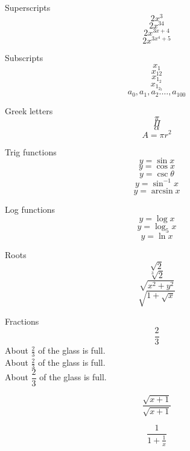 \documentclass[11pt]{article}
\begin{document}
Superscripts $$2x^3$$
$$2x^{34}$$
$$2x^{3x+4}$$
$$2x^{3x^4+5}$$

Subscripts
$$x_1$$
$$x_{12}$$
$$x_{1_2}$$
$$x_{1_{2_3}}$$
$$a_0, a_1, a_2. \ldots, a_{100}$$

Greek letters
$$\pi$$
$$\Pi$$
$$\alpha$$
$$A=\pi r^2$$

Trig functions
$$y=\sin x$$
$$y=\cos x$$
$$y=\csc \theta$$
$$y=\sin^{-1} x$$
$$y=\arcsin x$$

Log functions
$$y=\log x$$
$$y=\log_5 x$$
$$y=\ln x$$

Roots
$$\sqrt{2}$$
$$\sqrt[3]{2}$$
$$\sqrt{x^2+y^2}$$
$$\sqrt{1+\sqrt{x}}$$

Fractions
$$\frac{2}{3}$$
About $\frac{2}{3}$ of the glass is full.\\[16pt]
About $\displaystyle \frac{2}{3}$ of the glass is full.\\[6pt]
About $\dfrac{2}{3}$ of the glass is full.

$$\frac{\sqrt{x+1}}{\sqrt{x+1}}$$

$$\frac{1}{1+\frac{1}{x}}$$
\end{document}

